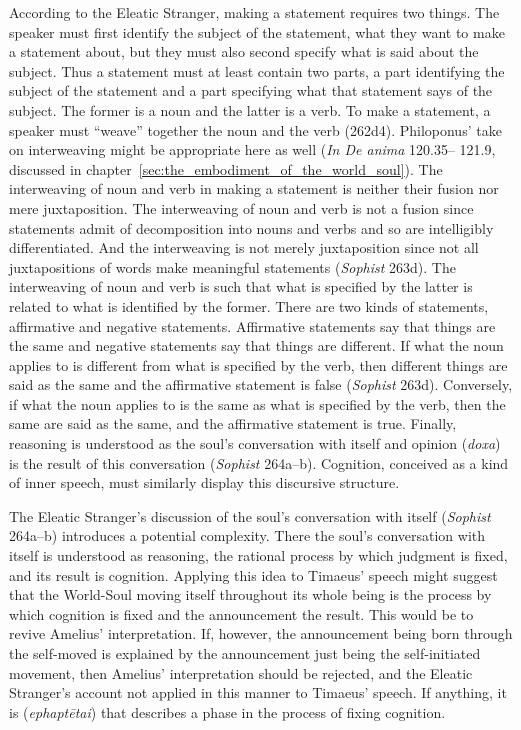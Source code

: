 According to the Eleatic Stranger, making a statement requires two things. The speaker must first identify the subject of the statement, what they want to make a statement about, but they must also second specify what is said about the subject. Thus a statement must at least contain two parts, a part identifying the subject of the statement and a part specifying what that statement says of the subject. The former is a noun and the latter is a verb. To make a statement, a speaker must ``weave'' together the noun and the verb (262d4). Philoponus' take on interweaving might be appropriate here as well (\emph{In De anima} 120.35– 121.9, discussed in chapter~\ref{sec:the_embodiment_of_the_world_soul}). The interweaving of noun and verb in making a statement is neither their fusion nor mere juxtaposition. The interweaving of noun and verb is not a fusion since statements admit of decomposition into nouns and verbs and so are intelligibly differentiated. And the interweaving is not merely juxtaposition since not all juxtapositions of words make meaningful statements (\emph{Sophist} 263d). The interweaving of noun and verb is such that what is specified by the latter is related to what is identified by the former. There are two kinds of statements, affirmative and negative statements. Affirmative statements say that things are the same and negative statements say that things are different. If what the noun applies to is different from what is specified by the verb, then different things are said as the same and the affirmative statement is false (\emph{Sophist} 263d). Conversely, if what the noun applies to is the same as what is specified by the verb, then the same are said as the same, and the affirmative statement is true. Finally, reasoning is understood as the soul's conversation with itself and opinion (\emph{doxa}) is the result of this conversation (\emph{Sophist} 264a--b). Cognition, conceived as a kind of inner speech, must similarly display this discursive structure.

The Eleatic Stranger's discussion of the soul's conversation with itself (\emph{Sophist} 264a--b) introduces a potential complexity. There the soul's conversation with itself is understood as reasoning, the rational process by which judgment is fixed, and its result is cognition. Applying this idea to Timaeus' speech might suggest that the World-Soul moving itself throughout its whole being is the process by which cognition is fixed and the announcement the result. This would be to revive Amelius' interpretation. If, however, the announcement being born through the self-moved is explained by the announcement just being the self-initiated movement, then Amelius' interpretation should be rejected, and the Eleatic Stranger's account not applied in this manner to Timaeus' speech. If anything, it is (\emph{ephaptētai}) that describes a phase in the process of fixing cognition.

